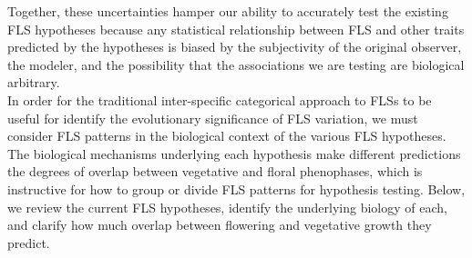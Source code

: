 \documentclass[12pt]{article}
\begin{document}
\indent Together, these uncertainties hamper our ability to accurately test the existing FLS hypotheses because any statistical relationship between FLS and other traits predicted by the hypotheses is biased by the subjectivity of the original observer, the modeler, and the possibility that the associations we are testing are biological arbitrary.\\

\indent In order for the traditional inter-specific categorical approach to FLSs to be useful for identify the evolutionary significance of FLS variation, we must consider FLS patterns in the biological context of the various FLS hypotheses. The biological mechanisms underlying each hypothesis make different predictions the degrees of overlap between vegetative and floral phenophases, which is instructive for how to group or divide FLS patterns for hypothesis testing. Below, we review the current FLS hypotheses, identify the underlying biology of each, and clarify how much overlap between flowering and vegetative growth they predict.
\end{document}
